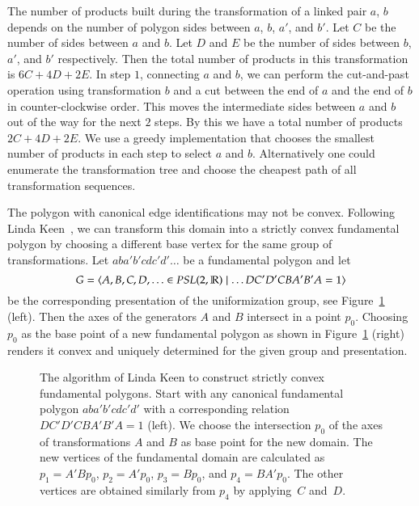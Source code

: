 \documentclass[Thesis]{subfiles}
\begin{document}
 The number of products built during the transformation of a linked pair $a$, $b$ depends on the number of polygon sides between $a$, $b$, $a'$, and $b'$. 
 Let $C$ be the number of sides between $a$ and $b$. Let $D$ and $E$ be the number of sides between $b$, $a'$, and $b'$ respectively. 
 Then the total number of products in this transformation is $6C+4D+2E$. 
 In step $1$, connecting $a$ and $b$, we can perform the cut-and-past operation using transformation $b$ and a cut between the end of $a$ and the end of $b$ in counter-clockwise order. 
 This moves the intermediate sides between $a$ and $b$ out of the way for the next $2$ steps. 
 By this we have a total number of products $2C+4D+2E$. 
 We use a greedy implementation that chooses the smallest number of products in each step to select $a$ and $b$.
 Alternatively one could enumerate the transformation tree and choose the cheapest path of all transformation sequences.


The polygon with canonical edge identifications may not be
convex. Following Linda Keen~\cite{keen1966}, we can transform this domain
into a strictly convex fundamental polygon by choosing a different
base vertex for the same group of transformations. Let
$aba'b'cdc'd'\ldots$ be a fundamental polygon and let
\begin{equation}
G=\left<A,B,C,D,\ldots\in \mathit{PSL}(2,\mathbb R)\mid \ldots DC'D'CBA'B'A =1\right>
\end{equation}
be the corresponding presentation of the uniformization group, see
Figure~\ref{fig:keen_polygon} (left). Then the axes of the generators
$A$ and $B$ intersect in a point $p_0$. Choosing $p_0$ as the base
point of a new fundamental polygon as shown in
Figure~\ref{fig:keen_polygon} (right) renders it convex and uniquely
determined for the given group and presentation.
\begin{figure}
\centering
{}
\caption{ The algorithm of Linda Keen to construct strictly convex
  fundamental polygons.  Start with any canonical fundamental polygon
  $aba'b'cdc'd'$ with a corresponding relation $DC'D'CBA'B'A=1$
  (left).  We choose the intersection $p_0$ of the axes of
  transformations $A$ and $B$ as base point for the new domain. The
  new vertices of the fundamental domain are calculated as
  $p_1=A'Bp_0$, $p_2=A'p_0$, $p_3=Bp_0$, and
  $p_4=BA'p_0$.  The other vertices are obtained similarly from $p_4$
  by applying~$C$ and~$D$.}
\label{fig:keen_polygon}
\end{figure}
\end{document}

